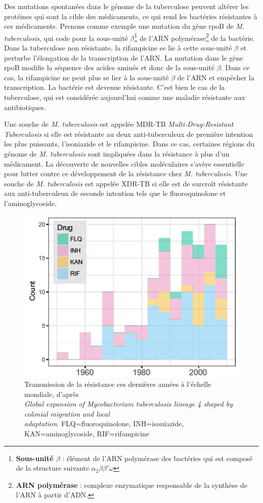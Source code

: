 \documentclass[twoside,a4paper,11pt,frenchb,openany]{report}
\begin{document}
Des mutations spontanées dans le génome de la tuberculose peuvent altérer les protéines qui sont la cible des médicaments, ce qui rend les bactéries résistantes à ces médicaments. Prenons comme exemple une mutation du gène rpoB de \textit{M. tuberculosis}, qui code pour la sous-unité $\beta$\footnote{\textbf{Sous-unité $\beta$} : élément de l'ARN polymérase des bactéries qui est composé de la structure suivante $\alpha_2 \beta \beta' \omega$} de l'ARN polymérase\footnote{\textbf{ARN polymérase} : complexe enzymatique responsable de la synthèse de l'ARN à partir d'ADN.} de la bactérie. Dans la tuberculose non résistante, la rifampicine se lie à cette sous-unité $\beta$ et perturbe l'élongation de la transcription de l'ARN. La mutation dans le gène rpoB modifie la séquence des acides aminés et donc de la sous-unité $\beta$. Dans ce cas, la rifampicine ne peut plus se lier à la sous-unité $\beta$ de l'ARN et empêcher la transcription. La bactérie est devenue résistante. C'est bien le cas de la tuberculose, qui est considérée aujourd'hui comme une maladie résistante aux antibiotiques. 

Une souche de \textit{M. tuberculosis} est appelée MDR-TB \textit{Multi-Drug-Resistant Tuberculosis} si elle est résistante au deux anti-tuberculeux de première intention les plus puissants, l'isoniazide et le rifampicine. Dans ce cas, certaines régions du génome de \textit{M. tuberculosis} sont impliquées dans la résistance à plus d'un médicament. La découverte de nouvelles cibles moléculaires s'avère essentielle pour lutter contre ce développement de la résistance chez \textit{M. tuberculosis}. Une souche de \textit{M. tuberculosis} est appelée XDR-TB si elle est de surcroît résistante aux anti-tuberculeux de seconde intention tels que le fluoroquinolone et l'aminoglycoside.

\begin{figure}[h!]
\centering
\includegraphics[scale=0.6]{amr.png}
\caption{Transmission de la résistance ces dernières années à l'échelle mondiale, d'après\\ \textit{Global expansion of Mycobacterium tuberculosis lineage 4 shaped by colonial migration and local\\ adaptation}. FLQ=fluoroquinolone, INH=isoniazide, KAN=aminoglycoside, RIF=rifampicine}
\end{figure}
\end{document}
